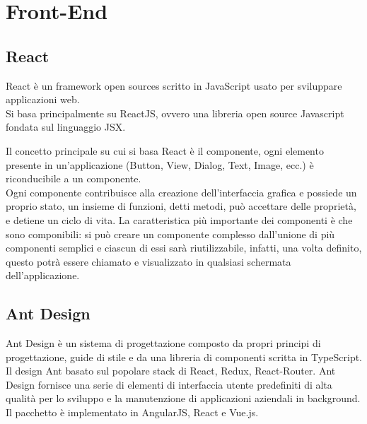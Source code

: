 \documentclass{report}
\begin{document}
\section{Front-End}
\subsection{React}
React è un framework open sources scritto in JavaScript usato per sviluppare applicazioni web.
\\Si basa principalmente su ReactJS, ovvero una
libreria open source Javascript fondata sul linguaggio JSX.
\par Il concetto principale su cui si basa React è il componente, ogni elemento presente in un’applicazione (Button, View, Dialog, Text,
Image, ecc.) è riconducibile a un componente. 
\\Ogni componente contribuisce alla creazione dell’interfaccia grafica e possiede un proprio
stato, un insieme di funzioni, detti metodi, può accettare delle proprietà, e
detiene un ciclo di vita.
La caratteristica più importante dei componenti è che sono componibili: si può
creare un componente complesso dall’unione di più componenti semplici e
ciascun di essi sarà riutilizzabile, infatti, una volta definito, questo potrà essere chiamato e visualizzato in qualsiasi schermata dell’applicazione.

\subsection{Ant Design}
Ant Design è un sistema di progettazione composto da propri principi di progettazione, guide di stile e da una libreria di componenti scritta in TypeScript.
\\Il design Ant basato sul popolare stack di React, Redux, React-Router. Ant Design fornisce una serie di elementi di interfaccia utente predefiniti di alta qualità per lo sviluppo e la manutenzione di applicazioni aziendali in background. Il pacchetto è implementato in AngularJS, React e Vue.js.
\end{document}
